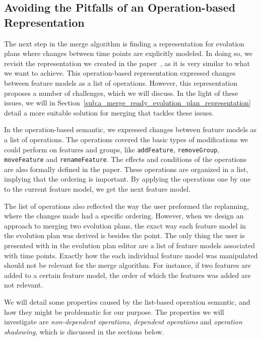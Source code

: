 \documentclass[a4paper,english]{ifimaster}
\begin{document}
\subsection{Avoiding the Pitfalls of an Operation-based Representation}%
\label{sub:avoiding_the_pitfalls_of_an_operation_based_representation}

The next step in the merge algorithm is finding a representation for evolution plans where changes between time points are explicitly modeled. In doing so, we revisit the representation we created in the paper~\cite{cite:consistency_preserving_evolution_planning}, as it is very similar to what we want to achieve. This operation-based representation expressed changes between feature models as a list of operations. However, this representation proposes a number of challenges, which we will discuss. In the light of these issues, we will in Section~\vref{sub:a_merge_ready_evolution_plan_representation} detail a more suitable solution for merging that tackles these issues.

In the operation-based semantic, we expressed changes between feature models as a list of operations. The operations covered the basic types of modifications we could perform on features and groups, like \texttt{addFeature}, \texttt{removeGroup}, \texttt{moveFeature} and \texttt{renameFeature}. The effects and conditions of the operations are also formally defined in the paper. These operations are organized in a list, implying that the ordering is important. By applying the operations one by one to the current feature model, we get the next feature model.

The list of operations also reflected the way the user preformed the replanning, where the changes made had a specific ordering. However, when we design an approach to merging two evolution plans, the exact way each feature model in the evolution plan was derived is besides the point. The only thing the user is presented with in the evolution plan editor are a list of feature models associated with time points. Exactly how the each individual feature model was manipulated should not be relevant for the merge algorithm. For instance, if two features are added to a certain feature model, the order of which the features was added are not relevant.

We will detail some properties caused by the list-based operation semantic, and how they might be problematic for our purpose. The properties we will investigate are \textit{non-dependent operations}, \textit{dependent operations} and \textit{operation shadowing}, which is discussed in the sections below.
\end{document}

